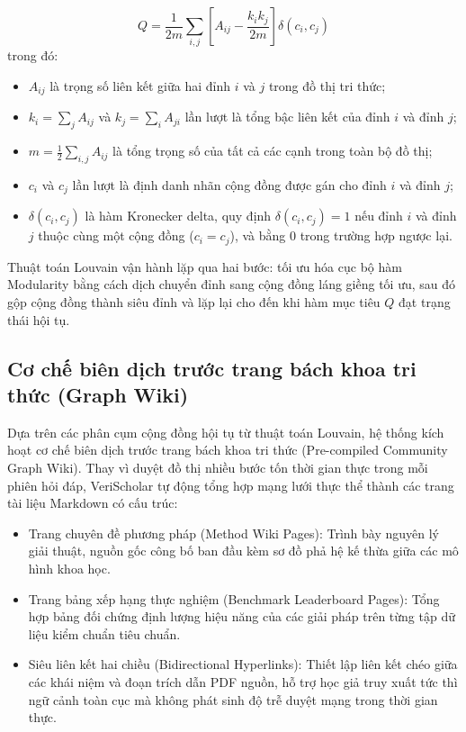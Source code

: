 \begin{equation}
\label{eq:louvain_modularity}
Q = \frac{1}{2m} \sum_{i,j} \left[ A_{ij} - \frac{k_i k_j}{2m} \right] \delta(c_i, c_j)
\end{equation}
trong đó:
\begin{itemize}
    \item $A_{ij}$ là trọng số liên kết giữa hai đỉnh $i$ và $j$ trong đồ thị tri thức;
    \item $k_i = \sum_j A_{ij}$ và $k_j = \sum_i A_{ji}$ lần lượt là tổng bậc liên kết của đỉnh $i$ và đỉnh $j$;
    \item $m = \frac{1}{2} \sum_{i,j} A_{ij}$ là tổng trọng số của tất cả các cạnh trong toàn bộ đồ thị;
    \item $c_i$ và $c_j$ lần lượt là định danh nhãn cộng đồng được gán cho đỉnh $i$ và đỉnh $j$;
    \item $\delta(c_i, c_j)$ là hàm Kronecker delta, quy định $\delta(c_i, c_j) = 1$ nếu đỉnh $i$ và đỉnh $j$ thuộc cùng một cộng đồng ($c_i = c_j$), và bằng $0$ trong trường hợp ngược lại.
\end{itemize}

Thuật toán Louvain vận hành lặp qua hai bước: tối ưu hóa cục bộ hàm Modularity bằng cách dịch chuyển đỉnh sang cộng đồng láng giềng tối ưu, sau đó gộp cộng đồng thành siêu đỉnh và lặp lại cho đến khi hàm mục tiêu $Q$ đạt trạng thái hội tụ.

\subsection{Cơ chế biên dịch trước trang bách khoa tri thức (Graph Wiki)}
\label{subsec:graph_wiki}
Dựa trên các phân cụm cộng đồng hội tụ từ thuật toán Louvain, hệ thống kích hoạt cơ chế biên dịch trước trang bách khoa tri thức (Pre-compiled Community Graph Wiki). Thay vì duyệt đồ thị nhiều bước tốn thời gian thực trong mỗi phiên hỏi đáp, VeriScholar tự động tổng hợp mạng lưới thực thể thành các trang tài liệu Markdown có cấu trúc:
\begin{itemize}
    \item Trang chuyên đề phương pháp (Method Wiki Pages): Trình bày nguyên lý giải thuật, nguồn gốc công bố ban đầu kèm sơ đồ phả hệ kế thừa giữa các mô hình khoa học.
    \item Trang bảng xếp hạng thực nghiệm (Benchmark Leaderboard Pages): Tổng hợp bảng đối chứng định lượng hiệu năng của các giải pháp trên từng tập dữ liệu kiểm chuẩn tiêu chuẩn.
    \item Siêu liên kết hai chiều (Bidirectional Hyperlinks): Thiết lập liên kết chéo giữa các khái niệm và đoạn trích dẫn PDF nguồn, hỗ trợ học giả truy xuất tức thì ngữ cảnh toàn cục mà không phát sinh độ trễ duyệt mạng trong thời gian thực.
\end{itemize}
